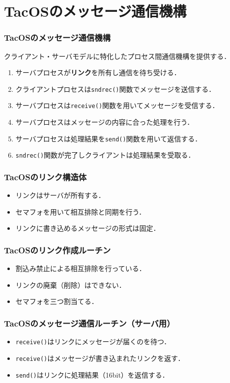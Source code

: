 \documentclass{beamer}                   %
\begin{document}
\section{TacOSのメッセージ通信機構}
\begin{frame}
  \frametitle{TacOSのメッセージ通信機構}
  クライアント・サーバモデルに特化したプロセス間通信機構を提供する．
  \begin{enumerate}
  \item サーバプロセスが{\bf リンク}を所有し通信を待ち受ける．
  \item クライアントプロセスは{\tt sndrec()}関数でメッセージを送信する．
  \item サーバプロセスは{\tt receive()}関数を用いてメッセージを受信する．
  \item サーバプロセスはメッセージの内容に合った処理を行う．
  \item サーバプロセスは処理結果を{\tt send()}関数を用いて返信する．
  \item {\tt sndrec()}関数が完了しクライアントは処理結果を受取る．
  \end{enumerate}
\end{frame}

\begin{frame}
  \frametitle{TacOSのリンク構造体}
  \begin{itemize}
  \item リンクはサーバが所有する．
  \item セマフォを用いて相互排除と同期を行う．
  \item リンクに書き込めるメッセージの形式は固定．
  \end{itemize}
\end{frame}

\begin{frame}
  \frametitle{TacOSのリンク作成ルーチン}
  \begin{itemize}
  \item 割込み禁止による相互排除を行っている．
  \item リンクの廃棄（削除）はできない．
  \item セマフォを三つ割当てる．
  \end{itemize}
\end{frame}

\begin{frame}
  \frametitle{TacOSのメッセージ通信ルーチン（サーバ用）}
  \begin{itemize}
  \item {\tt receive()}はリンクにメッセージが届くのを待つ．
  \item {\tt receive()}はメッセージが書き込まれたリンクを返す．
  \item {\tt send()}はリンクに処理結果（16bit）を返信する．
  \end{itemize}
\end{frame}
\end{document}
